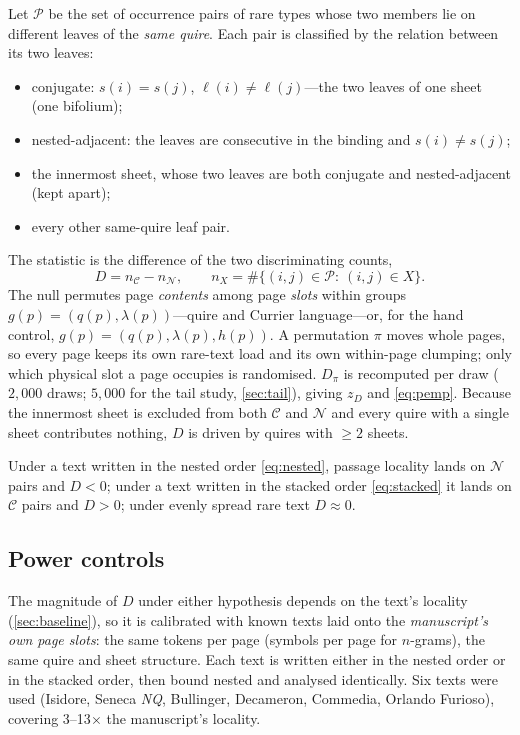 \documentclass[11pt,a4paper]{article}
\newcommand{\Dstat}{D}
\begin{document}
Let $\mathcal{P}$ be the set of occurrence pairs of rare types whose two members lie on different leaves of the \emph{same quire}. Each pair is classified by the relation between its two leaves:
\begin{itemize}
\item[$\mathcal{C}$] conjugate: $s(i)=s(j)$, $\ell(i)\neq\ell(j)$---the two leaves of one sheet (one bifolium);
\item[$\mathcal{N}$] nested-adjacent: the leaves are consecutive in the binding and $s(i)\neq s(j)$;
\item[$\mathcal{B}$] the innermost sheet, whose two leaves are both conjugate and nested-adjacent (kept apart);
\item[$\mathcal{O}$] every other same-quire leaf pair.
\end{itemize}
The statistic is the difference of the two discriminating counts,
\begin{equation}
\Dstat=n_{\mathcal{C}}-n_{\mathcal{N}},\qquad n_X=\#\{(i,j)\in\mathcal{P}:\ (i,j)\in X\}.
\label{eq:D}
\end{equation}
The null permutes page \emph{contents} among page \emph{slots} within groups $g(p)=(q(p),\lambda(p))$---quire and Currier language---or, for the hand control, $g(p)=(q(p),\lambda(p),h(p))$. A permutation $\pi$ moves whole pages, so every page keeps its own rare-text load and its own within-page clumping; only which physical slot a page occupies is randomised. $\Dstat_\pi$ is recomputed per draw ($2,000$ draws; $5,000$ for the tail study, \cref{sec:tail}), giving $z_{\Dstat}$ and \cref{eq:pemp}. Because the innermost sheet is excluded from both $\mathcal{C}$ and $\mathcal{N}$ and every quire with a single sheet contributes nothing, $\Dstat$ is driven by quires with $\ge 2$ sheets.

Under a text written in the nested order \cref{eq:nested}, passage locality lands on $\mathcal{N}$ pairs and $\Dstat<0$; under a text written in the stacked order \cref{eq:stacked} it lands on $\mathcal{C}$ pairs and $\Dstat>0$; under evenly spread rare text $\Dstat\approx0$.

\subsection{Power controls}

The magnitude of $\Dstat$ under either hypothesis depends on the text's locality (\cref{sec:baseline}), so it is calibrated with known texts laid onto the \emph{manuscript's own page slots}: the same tokens per page (symbols per page for $n$-grams), the same quire and sheet structure. Each text is written either in the nested order or in the stacked order, then bound nested and analysed identically. Six texts were used (Isidore, Seneca \emph{NQ}, Bullinger, Decameron, Commedia, Orlando Furioso), covering 3--13$\times$ the manuscript's locality.
\end{document}
